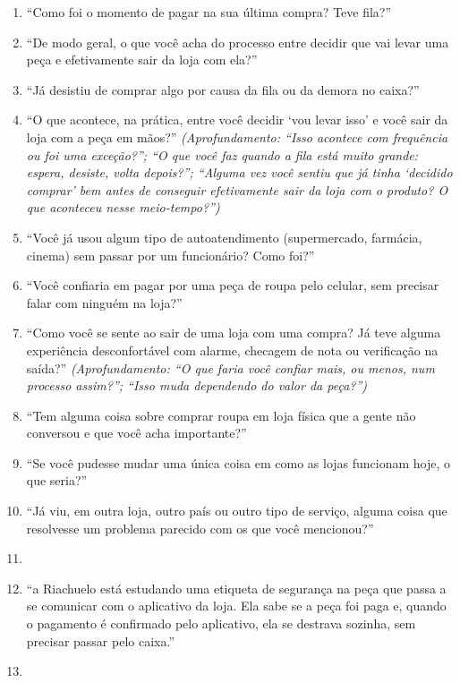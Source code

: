 \begin{enumerate}
    \item ``Como foi o momento de pagar na sua última compra? Teve fila?''
    \item ``De modo geral, o que você acha do processo entre decidir que vai levar uma peça e efetivamente sair da loja com ela?''
    \item ``Já desistiu de comprar algo por causa da fila ou da demora no caixa?''
    \item ``O que acontece, na prática, entre você decidir `vou levar isso' e você sair da loja com a peça em mãos?'' \textit{(Aprofundamento: ``Isso acontece com frequência ou foi uma exceção?''; ``O que você faz quando a fila está muito grande: espera, desiste, volta depois?''; ``Alguma vez você sentiu que já tinha `decidido comprar' bem antes de conseguir efetivamente sair da loja com o produto? O que aconteceu nesse meio-tempo?'')}
    \item ``Você já usou algum tipo de autoatendimento (supermercado, farmácia, cinema) sem passar por um funcionário? Como foi?''
    \item ``Você confiaria em pagar por uma peça de roupa pelo celular, sem precisar falar com ninguém na loja?''
    \item ``Como você se sente ao sair de uma loja com uma compra? Já teve alguma experiência desconfortável com alarme, checagem de nota ou verificação na saída?'' \textit{(Aprofundamento: ``O que faria você confiar mais, ou menos, num processo assim?''; ``Isso muda dependendo do valor da peça?'')}
    \item ``Tem alguma coisa sobre comprar roupa em loja física que a gente não conversou e que você acha importante?''
    \item ``Se você pudesse mudar uma única coisa em como as lojas funcionam hoje, o que seria?''
    \item ``Já viu, em outra loja, outro país ou outro tipo de serviço, alguma coisa que resolvesse um problema parecido com os que você mencionou?''
    \item{}
    \item{} ``a Riachuelo está estudando uma etiqueta de segurança na peça que passa a se comunicar com o aplicativo da loja. Ela sabe se a peça foi paga e, quando o pagamento é confirmado pelo aplicativo, ela se destrava sozinha, sem precisar passar pelo caixa.''
    \item{}

\end{enumerate}
